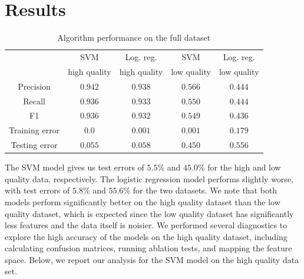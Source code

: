 \documentclass[twocolumn]{article}
\begin{document}
\section{Results}
\begin{table}[b]
    \centering
    \caption{Algorithm performance on the full dataset}
    \resizebox{\columnwidth}{!} {
        \begin{tabular}{|c|c|c|c|c|}
        \hline
         & SVM & Log. reg. & SVM & Log. reg.\\
         & high quality & high quality & low quality & low quality\\ \hline
        Precision & $0.942$ & $0.938$ & $0.566$ & $0.444$ \\
        Recall & $0.936$ & $0.933$ & $0.550$ & $0.444$ \\
        F1 & $0.936$ & $0.932$ & $0.549$ & $0.436$ \\ 
        Training error & $0.0$ & $0.001$ & $0.001$ & $0.179$ \\
        Testing error & $0.055$ & $0.058$ & $0.450$ & $0.556$ \\ \hline
        \end{tabular}
    }
    \label{table:comparison}
\end{table}
The SVM model gives us test errors of $5.5\%$ and $45.0\%$ for the high and low quality data, respectively. The logistic regression model performs slightly worse, with test errors of $5.8\%$ and $55.6\%$ for the two datasets. We note that both models perform significantly better on the high quality dataset than the low quality dataset, which is expected since the low quality dataset has significantly less features and the data itself is noisier. We performed several diagnostics to explore the high accuracy of the models on the high quality dataset, including calculating confusion matrices, running ablation tests, and mapping the feature space. Below, we report our analysis for the SVM model on the high quality data set. 
\end{document}
